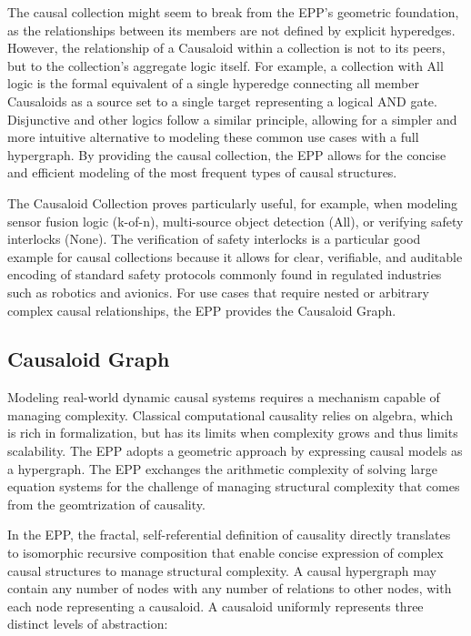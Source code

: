  The causal collection might seem to break from the EPP's geometric foundation, as the relationships between its members are not defined by explicit hyperedges. However,  the relationship of a Causaloid within a collection is not to its peers, but to the collection's aggregate logic itself. For example, a collection with All logic is the formal equivalent of a single hyperedge connecting all member Causaloids as a source set to a single target representing a logical AND gate. Disjunctive and other logics follow a similar principle, allowing for a simpler and more intuitive alternative to modeling these common use cases with a full hypergraph. By providing the causal collection, the EPP allows for the concise and efficient modeling of the most frequent types of causal structures.
 
  The Causaloid Collection proves particularly useful, for example, when modeling sensor fusion logic (k-of-n), multi-source object detection (All), or verifying safety interlocks (None). The verification of safety interlocks is a particular good example for causal collections because it allows for clear, verifiable, and auditable encoding of standard safety protocols commonly found in regulated industries such as robotics and avionics. For use cases that require nested or arbitrary complex causal relationships, the EPP provides the Causaloid Graph.


%
%
\subsection{Causaloid Graph}
\label{sec:epp_causaloid_graph}

Modeling real-world dynamic causal systems requires a mechanism capable of managing complexity.
Classical computational causality relies on algebra, which is rich in formalization,
but has its limits when complexity grows and thus limits scalability. The EPP adopts 
a geometric approach by expressing causal models as a hypergraph. The EPP
exchanges the arithmetic complexity of solving large equation systems for the challenge of managing structural complexity that comes from the geomtrization of causality.

In the EPP, the fractal, self-referential definition of causality directly translates 
to isomorphic recursive composition that enable concise expression of complex causal structures to manage structural complexity. A causal hypergraph may contain any number of nodes with any number of relations to other nodes, with each node representing a causaloid. A causaloid uniformly represents three distinct levels of abstraction:

